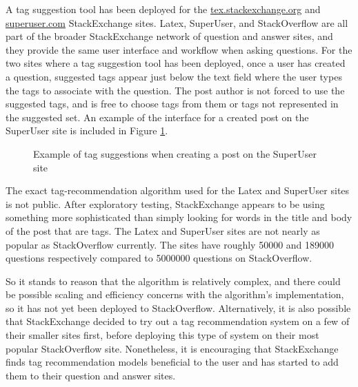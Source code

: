 \documentclass[man,floatsintext,donotrepeattitle]{apa6}
\begin{document}
A tag suggestion tool has been deployed for the \url{tex.stackexchange.org} \parencite{LatexTags2013} and \url{superuser.com} \parencite{SuperUserTags2013} StackExchange sites.
Latex, SuperUser, and StackOverflow are all part of the broader StackExchange network of question and answer sites, and they provide the same user interface and workflow when asking questions.
For the two sites where a tag suggestion tool has been deployed, once a user has created a question, suggested tags appear just below the text field where the user types the tags to associate with the question.
The post author is not forced to use the suggested tags, and is free to choose tags from them or tags not represented in the suggested set.
An example of the interface for a created post on the SuperUser site is included in Figure \ref{figSuperUserSuggestion}.

\begin{figure}[!htbp]
  \caption{Example of tag suggestions when creating a post on the SuperUser site}
  \label{figSuperUserSuggestion}
\end{figure}

The exact tag-recommendation algorithm used for the Latex and SuperUser sites is not public.
After exploratory testing, StackExchange appears to be using something more sophisticated than simply looking for words in the title and body of the post that are tags.
The Latex and SuperUser sites are not nearly as popular as StackOverflow currently.
The sites have roughly \num{50000} and \num{189000} questions respectively compared to \num{5000000} questions on StackOverflow.

So it stands to reason that the algorithm is relatively complex, and there could be possible scaling and efficiency concerns with the algorithm's implementation, so it has not yet been deployed to StackOverflow.
Alternatively, it is also possible that StackExchange decided to try out a tag recommendation system on a few of their smaller sites first, before deploying this type of system on their most popular StackOverflow site.
Nonetheless, it is encouraging that StackExchange finds tag recommendation models beneficial to the user and has started to add them to their question and answer sites. 
\end{document}
